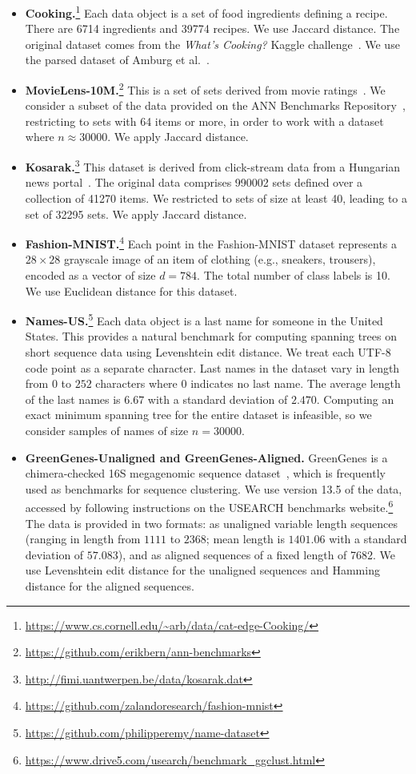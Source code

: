 \begin{itemize}[label = {},leftmargin = 10pt, itemsep = 0pt]
	\item \textbf{Cooking.}\footnote{\url{https://www.cs.cornell.edu/~arb/data/cat-edge-Cooking/}} Each data object is a set of food ingredients defining a recipe. There are 6714 ingredients and 39774 recipes. We use Jaccard distance. The original dataset comes from the \emph{What's Cooking?} Kaggle challenge~\cite{kaggle2015cooking}. We use the parsed dataset of Amburg et al.~\cite{amburg2020clustering}.
	\item \textbf{MovieLens-10M.}\footnote{\url{https://github.com/erikbern/ann-benchmarks}} This is a set of sets derived from movie ratings~\cite{movie_lens}. We consider a subset of the data provided on the ANN Benchmarks Repository~\cite{annBenchmarks}, restricting to sets with 64 items or more, in order to work with a dataset where $n \approx 30000$. We apply Jaccard distance.
	\item \textbf{Kosarak.}\footnote{\url{http://fimi.uantwerpen.be/data/kosarak.dat}} This dataset is derived from click-stream data from a Hungarian news portal~\cite{kosarak}. The original data comprises 990002 sets defined over a collection of 41270 items. We restricted to sets of size at least 40, leading to a set of 32295 sets. We apply Jaccard distance.
	\item \textbf{Fashion-MNIST.}\footnote{\url{https://github.com/zalandoresearch/fashion-mnist}} Each point in the Fashion-MNIST dataset represents a $28 \times 28$ grayscale image of an item of clothing (e.g., sneakers, trousers), encoded as a vector of size $d = 784$. The total number of class labels is 10. We use Euclidean distance for this dataset.
	\item \textbf{Names-US.}\footnote{\url{https://github.com/philipperemy/name-dataset}} Each data object is a last name for someone in the United States. This provides a natural benchmark for computing spanning trees on short sequence data using Levenshtein edit distance. We treat each UTF-8 code point as a separate character. Last names in the dataset vary in length from $0$ to $252$ characters where $0$ indicates no last name. The average length of the last names is $6.67$ with a standard deviation of $2.470$. Computing an exact minimum spanning tree for the entire dataset is infeasible, so we consider samples of names of size $n = 30000$.
	
	\item \textbf{GreenGenes-Unaligned and GreenGenes-Aligned.} GreenGenes is a chimera-checked 16S megagenomic sequence dataset~\cite{greengenesDataset}, which is frequently used as benchmarks for sequence clustering. We use version 13.5 of the data, accessed by following instructions on the USEARCH benchmarks website.\footnote{\url{https://www.drive5.com/usearch/benchmark_ggclust.html}} The data is provided in two formats: as unaligned variable length sequences (ranging in length from $1111$ to $2368$; mean length is $1401.06$ with a standard deviation of $57.083$), and as aligned sequences of a fixed length of 7682. We use Levenshtein edit distance for the unaligned sequences and Hamming distance for the aligned sequences. 
\end{itemize}


